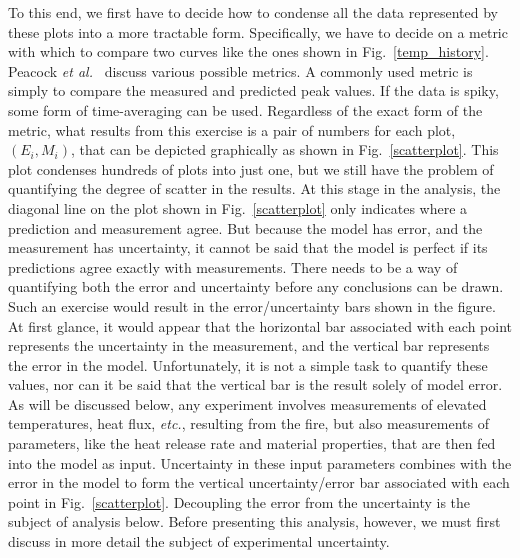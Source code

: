 To this end, we first have to decide how to condense all the data represented by these plots into a more tractable form. Specifically, we
have to decide on a metric with which to compare two curves like the ones shown in Fig.~\ref{temp_history}. Peacock {\em et al.}~\cite{Peacock:FSJ1999}
discuss various possible metrics. A commonly used metric is simply to compare the measured and predicted peak values.
If the data is spiky, some form of time-averaging can be used. Regardless of the exact form of the metric, what results from
this exercise is a pair of numbers for each plot, $(E_i,M_i)$, that can be depicted graphically as shown in Fig.~\ref{scatterplot}. This plot
condenses hundreds of plots into just one, but we still have the problem of quantifying the degree of scatter in the results. At this stage in the analysis, the
diagonal line on the plot shown in Fig.~\ref{scatterplot} only indicates where a prediction and measurement agree. But because the model has error, and
the measurement has uncertainty, it cannot be said that the model is perfect if its predictions agree exactly with measurements. There needs to be a way of quantifying
both the error and uncertainty before any conclusions can be drawn.
Such an exercise would result in the error/uncertainty bars shown in the figure. At first glance, it would appear that the
horizontal bar associated with each point represents the uncertainty in the measurement, and the vertical bar represents the error in the model. Unfortunately, it
is not a simple task to quantify these values, nor can it be said that the vertical bar is the result solely of model error. As will be discussed below, any
experiment involves measurements of elevated temperatures, heat flux, {\em etc.}, resulting from the fire, but also measurements of parameters, like the
heat release rate and material properties, that are then fed into the model as input. Uncertainty in these input parameters combines with the error in the model
to form the vertical uncertainty/error bar associated with each point in Fig.~\ref{scatterplot}. Decoupling the error from the uncertainty
is the subject of analysis below. Before presenting this
analysis, however, we must first discuss in more detail the subject of experimental uncertainty.

